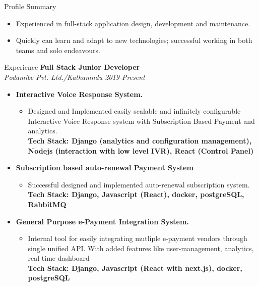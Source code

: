 \documentclass{resume} %
\begin{document}
\begin{rSection}{Profile Summary}
\begin{itemize}
    \item  Experienced in full-stack application design, development and maintenance.
    \item  Quickly can learn and adapt to new technologies; successful working in both teams and solo endeavours.
\end{itemize}
\end{rSection}

\begin{rSection}{Experience}
\large{{\bf Full Stack Junior Developer}}
\\ \small{\textit{Podamibe Pvt. Ltd./Kathamndu 2019-Present}}
\begin{itemize}
    \item \textbf{Interactive Voice Response System.}
        \begin{itemize}
            \item Designed and Implemented easily scalable and infinitely configurable Interactive Voice Response system
            with Subscription Based Payment and analytics.
            \\ \footnotesize{\textbf{Tech Stack: Django (analytics and configuration management), Nodejs (interaction with low level IVR), React (Control Panel)}}
        \end{itemize}
    
    \item \textbf{Subscription based auto-renewal Payment System}
        \begin{itemize}
            \item Successful designed and implemented auto-renewal subscription system.
            \\ \footnotesize{\textbf{Tech Stack: Django, Javascript (React), docker, postgreSQL, RabbitMQ}}
        \end{itemize}
    
    \item \textbf{General Purpose e-Payment Integration System.}
        \begin{itemize}
            \item Internal tool for easily integrating mutliple e-payment vendors through single unified API. With added features like user-management, analytics, real-time dashboard
            \\ \footnotesize{\textbf{Tech Stack: Django, Javascript (React with next.js), docker, postgreSQL}}    
        \end{itemize}
    

\end{itemize}
\end{rSection}
\end{document}
